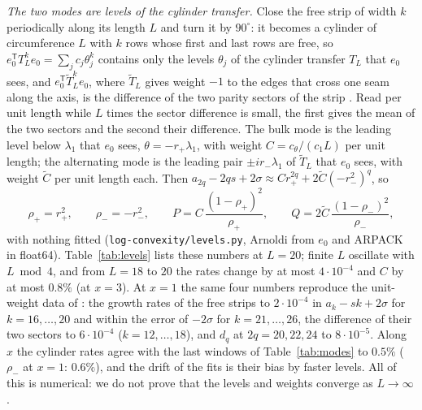 \documentclass[11pt]{amsart}
\theoremstyle{definition}
\theoremstyle{remark}
\newcommand{\file}[1]{\texttt{#1}}
\begin{document}
\emph{The two modes are levels of the cylinder transfer.} Close the free strip of width $k$
periodically along its length $L$ and turn it by $90^\circ$: it becomes a cylinder of circumference
$L$ with $k$ rows whose first and last rows are free, so
$e_0^{\mathsf T} T_L^k e_0 = \sum_j c_j \theta_j^k$ contains only the levels $\theta_j$ of the
cylinder transfer $T_L$ that $e_0$ sees, and $e_0^{\mathsf T} \tilde T_L^k e_0$, where $\tilde T_L$
gives weight $-1$ to the edges that cross one seam along the axis, is the difference of the two
parity sectors of the strip \cite[\S6]{rylko2026entropy}. Read per unit length while $L$ times the
sector difference is small, the first gives the mean of the two sectors and the second their
difference. The bulk mode is the leading level below
$\lambda_1$ that $e_0$ sees, $\theta = -r_+\lambda_1$, with weight $C = c_\theta/(c_1 L)$ per unit
length; the alternating mode is the leading pair $\pm i r_-\lambda_1$ of $\tilde T_L$ that $e_0$
sees, with weight $\tilde C$ per unit length each. Then $a_{2q} - 2qs + 2\sigma \approx C r_+^{2q} +
2\tilde C (-r_-^2)^q$, so
\[
  \rho_+ = r_+^2, \qquad \rho_- = -r_-^2, \qquad P = C\,\frac{(1 - \rho_+)^2}{\rho_+}, \qquad
  Q = 2\tilde C\,\frac{(1 - \rho_-)^2}{\rho_-},
\]
with nothing fitted (\file{log-convexity/levels.py}, Arnoldi from $e_0$ and ARPACK in float64).
Table~\ref{tab:levels} lists these numbers at $L = 20$; finite $L$ oscillate with $L \bmod 4$, and
from $L = 18$ to $20$ the rates change by at most $4\cdot10^{-4}$ and $C$ by at most $0.8\%$ (at
$x = 3$). At $x = 1$ the same four numbers reproduce the unit-weight data of
\cite[\S8]{rylko2026entropy}: the growth rates of the free strips to $2\cdot10^{-4}$ in
$a_k - sk + 2\sigma$ for $k = 16, \dots, 20$ and within the error of $-2\sigma$ for
$k = 21, \dots, 26$, the difference of their two sectors to $6\cdot10^{-4}$ ($k = 12, \dots, 18$),
and $d_q$ at $2q = 20, 22, 24$ to $8\cdot10^{-5}$. Along $x$ the cylinder rates agree with the last
windows of Table~\ref{tab:modes} to $0.5\%$ ($\rho_-$ at $x = 1$: $0.6\%$), and the drift of the
fits is their bias by faster levels. All of this is numerical: we do not prove that the levels
and weights converge as $L \to \infty$.
\end{document}
